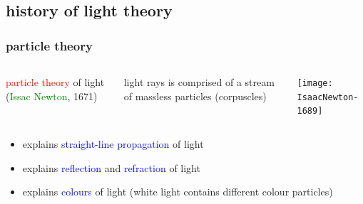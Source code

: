 \documentclass[12pt,xcolor=svgnames,handout]{beamer}
\newcommand{\tightframetitle}[1]{ %
\frametitle{#1}\vspace{-.6\baselineskip}}
\begin{document}
\subsection{history of light theory}
\begin{frame}
\tightframetitle{particle theory}

\begin{columns}
\begin{block}{}
\textcolor{red}{particle theory} of light (\textcolor{Green}{Issac Newton}, 1671)
\end{block}

\begin{block}{}
light rays is comprised of a stream of massless particles (corpuscles)
\end{block}

\begin{block}{}
\centering
\texttt{[image: IsaacNewton-1689]}
\end{block}
\end{columns}

\pause

\begin{block}{}
\begin{itemize}
\item explains \textcolor{blue}{straight-line propagation} of light

\item explains \textcolor{blue}{reflection} and \textcolor{blue}{refraction} of light

\item explains \textcolor{blue}{colours} of light (white light contains different colour particles)
\end{itemize}
\end{block}

\end{frame}

\end{document}
